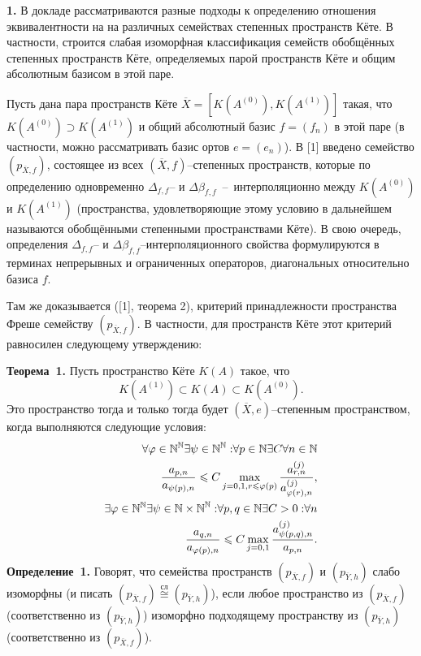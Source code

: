 

\vzmscaption
{\bf 1. }В докладе рассматриваются разные подходы к определению отношения эквивалентности на на различных семействах степенных пространств Кёте. В частности, строится слабая изоморфная классификация семейств обобщённых степенных пространств Кёте,
определяемых парой пространств Кёте и общим абсолютным базисом в этой паре.

Пусть дана пара пространств Кёте  $\overline{X}=[K(A^{(0)}),K(A^{(1)})]$ такая, что
$K(A^{(0)})\supset K(A^{(1)})$ и общий абсолютный базис $f=(f_n)$ в этой паре (в частности, можно
рассматривать базис ортов $e=(e_n)$). В [1] введено семейство $(p_{\overline{X},f})$, состоящее из
всех $(\overline{X},f)$--степенных пространств, которые по определению одновременно $\Delta_{f,f}$-- и
$\Delta\beta _{f,f}$~--~интерполяционно между $K(A^{(0)})$ и $K(A^{(1)})$ (пространства, удовлетворяющие
этому условию в дальнейшем называются обобщёнными степенными пространствами Кёте). В свою очередь,
определения $\Delta_{f,f}$-- и $\Delta\beta _{f,f}$--интерполяционного свойства формулируются в
терминах непрерывных и ограниченных операторов, диагональных относительно базиса $f$.

Там же доказывается ([1], теорема 2), критерий принадлежности пространства Фреше семейству
$(p_{\overline{X},f})$. В частности, для пространств Кёте этот
критерий равносилен следующему утверждению:

\noindent\textbf{Теорема~1.}
Пусть пространство Кёте $K(A)$ такое, что
$$K(A^{(1)})\subset K(A)\subset K(A^{(0)}).$$ Это пространство
тогда и только тогда будет $(\overline{X},e)$--степенным пространством, когда
выполняются следующие условия:
\begin{eqnarray*}
\forall{\varphi \in {\Bbb N}^{\Bbb N}}\exists{\psi \in {\Bbb N}^{\Bbb N}:}
\forall{p\in {\Bbb N}}\exists{C}\forall{n \in {\Bbb N}}\\
\dfrac{a_{p,n}}{a_{\psi(p),n}}\leqslant C
\max\limits_{j=0,1,r\leqslant \varphi(p)}
\dfrac{a^{(j)}_{r,n}}{a^{(j)}_{\varphi (r),n}}, \\
\exists{\varphi \in {\Bbb N}^{\Bbb N}}\exists{\psi \in {\Bbb N\times {\Bbb N}}^{\Bbb N}:}
\forall{p,q\in {\Bbb N}}\exists{C>0:}\forall{n}\\
\dfrac{a_{q,n}}{a_{\varphi (p),n}}\leqslant C
\max\limits_{j=0,1}
\dfrac{a^{(j)}_{\psi(p,q),n}}{a_{p,n}}.
\end{eqnarray*}
\noindent\textbf{Определение~1.}
Говорят, что семейства про\-странств $(p_{\overline{X},f})$ и $(p_{\overline{Y},h})$ слабо изоморфны
(и писать
$(p_{\overline{X},f})\stackrel{\text{сл}}{\cong}(p_{\overline{Y},h})$), если любое пространство  из
$(p_{\overline{X},f})$ (соответственно из $(p_{\overline{Y},h})$) изоморфно подходящему пространству из
$(p_{\overline{Y},h})$ (соответственно из $(p_{\overline{X},f})$).

